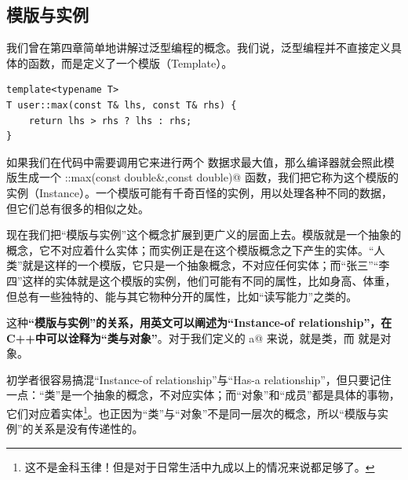 \subsection*{模版与实例}
我们曾在第四章简单地讲解过泛型编程的概念。我们说，泛型编程并不直接定义具体的函数，而是定义了一个模版（Template）。
\begin{lstlisting}
template<typename T>
T user::max(const T& lhs, const T& rhs) {
    return lhs > rhs ? lhs : rhs;
}
\end{lstlisting}
如果我们在代码中需要调用它来进行两个 \lstinline@double@ 数据求最大值，那么编译器就会照此模版生成一个 \lstinline@user::max(const double&,const double)@ 函数，我们把它称为这个模版的实例（Instance）。一个模版可能有千奇百怪的实例，用以处理各种不同的数据，但它们总有很多的相似之处。\par
现在我们把``模版与实例''这个概念扩展到更广义的层面上去。模版就是一个抽象的概念，它不对应着什么实体；而实例正是在这个模版概念之下产生的实体。``人类''就是这样的一个模版，它只是一个抽象概念，不对应任何实体；而``张三''``李四''这样的实体就是这个模版的实例，他们可能有不同的属性，比如身高、体重，但总有一些独特的、能与其它物种分开的属性，比如``读写能力''之类的。\par
这种\textbf{``模版与实例''的关系，用英文可以阐述为``Instance-of relationship''，在C++中可以诠释为``类与对象''}。对于我们定义的 \lstinline@valarri a@ 来说，\lstinline@valarri@ 就是类，而 \lstinline@a@ 就是对象。\par
初学者很容易搞混``Instance-of relationship''与``Has-a relationship''，但只要记住一点：``类''是一个抽象的概念，不对应实体；而``对象''和``成员''都是具体的事物，它们对应着实体\footnote{这不是金科玉律！但是对于日常生活中九成以上的情况来说都足够了。}。也正因为``类''与``对象''不是同一层次的概念，所以``模版与实例''的关系是没有传递性的。\par
